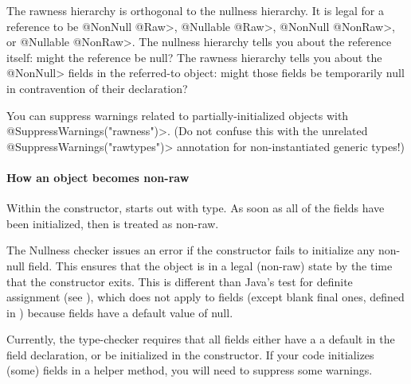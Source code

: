 The rawness hierarchy is orthogonal to the nullness hierarchy.  It
is legal for a reference to be \<@NonNull @Raw>, \<@Nullable @Raw>,
\<@NonNull @NonRaw>, or \<@Nullable @NonRaw>.  The nullness hierarchy tells
you about the reference itself:  might the reference be null?  The rawness
hierarchy tells you about the \<@NonNull> fields in the referred-to object:
might those fields be temporarily null in contravention of their
declaration?




You can suppress warnings related to partially-initialized objects with
\<@SuppressWarnings("rawness")>.  (Do not confuse this with the unrelated
\<@SuppressWarnings("rawtypes")> annotation for non-instantiated generic types!)


\paragraph{How an object becomes non-raw}

Within the constructor,
 starts out with  type.
As soon as all of the  fields
have been initialized, then  is treated as non-raw.

The Nullness checker issues an error if the constructor fails to initialize
any non-null field.  This ensures that the object is in a legal (non-raw)
state by the time that the constructor exits.
This is different than Java's test for definite assignment (see
),
which does not apply to fields (except blank final ones, defined in
) because fields
have a default value of null.



Currently, the type-checker requires that all fields either have a a
default in the field declaration, or be initialized in the constructor.  If
your code initializes (some) fields in a helper method, you will need to
suppress some warnings.



